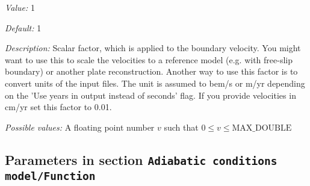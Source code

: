 \begin{itemize}
{\it Value:} 1


{\it Default:} 1


{\it Description:} Scalar factor, which is applied to the boundary velocity. You might want to use this to scale the velocities to a reference model (e.g. with free-slip boundary) or another plate reconstruction. Another way to use this factor is to convert units of the input files. The unit is assumed to bem/s or m/yr depending on the 'Use years in output instead of seconds' flag. If you provide velocities in cm/yr set this factor to 0.01.


{\it Possible values:} A floating point number $v$ such that $0 \leq v \leq \text{MAX\_DOUBLE}$
\end{itemize}

\subsection{Parameters in section \tt Adiabatic conditions model/Function}
\label{parameters:Adiabatic_20conditions_20model/Function}

